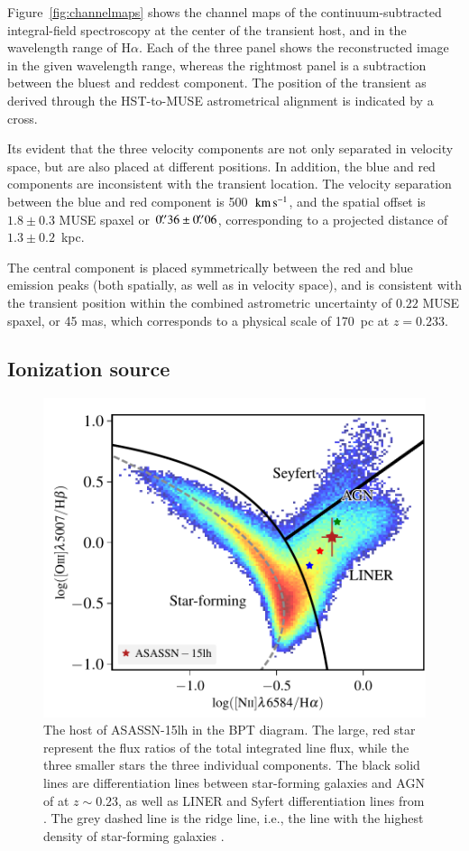 \documentclass[traditabstract]{aa}
\newcommand{\farc}{\hbox{$.\!\!^{\prime\prime}$}}
\newcommand{\kms}{$\rm{km\,s^{-1}}$}
\newcommand{\ha}{H$\alpha$}
\begin{document}
Figure~\ref{fig:channelmaps} shows the channel maps of the continuum-subtracted integral-field spectroscopy at the center of the transient host, and in the wavelength range of \ha. Each of the three panel shows the reconstructed image in the given wavelength range, whereas the rightmost panel is a subtraction between the bluest and reddest component. The position of the transient as derived through the HST-to-MUSE astrometrical alignment is indicated by a cross.

Its evident that the three velocity components are not only separated in velocity space, but are also placed at different positions. In addition, the blue and red components are inconsistent with the transient location. The velocity separation between the blue and red component is 500~\kms, and the spatial offset is $1.8\pm0.3$ MUSE spaxel or $0\farc{36}\pm0\farc{06}$, corresponding to a projected distance of $1.3\pm0.2$~kpc.

The central component is placed symmetrically between the red and blue emission peaks (both spatially, as well as in velocity space), and is consistent with the transient position within the combined astrometric uncertainty of $0.22$ MUSE spaxel, or 45 mas, which corresponds to a physical scale of 170~pc at $z=0.233$.

\subsection{Ionization source}
\label{sec:ionsource}

\begin{figure}
  \includegraphics[width=0.999\linewidth]{fig/BPT.pdf}
\caption{The host of ASASSN-15lh in the BPT diagram. The large, red star represent the flux ratios of the total integrated line flux, while the three smaller stars the three individual components. The black solid lines are differentiation lines between star-forming galaxies and AGN of \citet{2013ApJ...774L..10K} at $z\sim0.23$, as well as LINER and Syfert differentiation lines from \citet{2010MNRAS.403.1036C}. The grey dashed line is the ridge line, i.e., the line with the highest density of star-forming galaxies \citep{2008MNRAS.385..769B}.}
\label{fig:BPT}
\end{figure}
\end{document}
